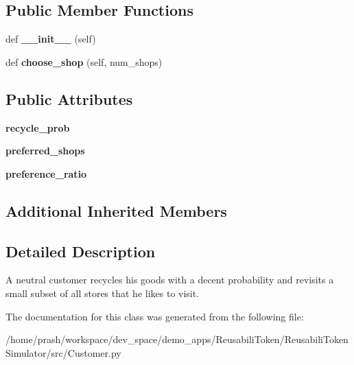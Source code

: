\subsection*{Public Member Functions}
\begin{DoxyCompactItemize}
\item 
\mbox{\label{class_customer_1_1_neutral_customer_a17dfe793e750ec44daad18fadf64bb76}} 
def {\bfseries \+\_\+\+\_\+init\+\_\+\+\_\+} (self)
\item 
\mbox{\label{class_customer_1_1_neutral_customer_a24af596788db64a679ea26ced7e1664b}} 
def {\bfseries choose\+\_\+shop} (self, num\+\_\+shops)
\end{DoxyCompactItemize}
\subsection*{Public Attributes}
\begin{DoxyCompactItemize}
\item 
\mbox{\label{class_customer_1_1_neutral_customer_a7f16af6df93d1cd9553a787f468642b8}} 
{\bfseries recycle\+\_\+prob}
\item 
\mbox{\label{class_customer_1_1_neutral_customer_a9b0a639e5346d26c28f1f95f3038d779}} 
{\bfseries preferred\+\_\+shops}
\item 
\mbox{\label{class_customer_1_1_neutral_customer_a1aa0d47d29a0d0d00b8f86f88582f6d0}} 
{\bfseries preference\+\_\+ratio}
\end{DoxyCompactItemize}
\subsection*{Additional Inherited Members}


\subsection{Detailed Description}
\begin{DoxyVerb}A neutral customer recycles his goods with a decent probability and revisits a small subset of all stores
that he likes to visit.
\end{DoxyVerb}
 

The documentation for this class was generated from the following file\+:\begin{DoxyCompactItemize}
\item 
/home/prash/workspace/dev\+\_\+space/demo\+\_\+apps/\+Reusabili\+Token/\+Reusabili\+Token\+Simulator/src/Customer.\+py\end{DoxyCompactItemize}
